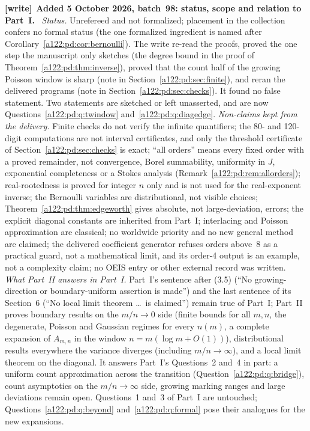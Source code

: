 \documentclass[11pt,letterpaper]{article}
\newenvironment{writenote}[1][]{\par\smallskip\begingroup\small
 \noindent\textbf{[write]}\if\relax\detokenize{#1}\relax\else~\textbf{#1.}\fi\ }%
 {\par\endgroup\smallskip}
\numberwithin{equation}{subsection}
\theoremstyle{definition}
\theoremstyle{remark}
\theoremstyle{plain}
\begin{document}
\begin{writenote}[Added 5 October 2026, batch~98: status, scope and relation to Part~I]
\emph{Status.} Unrefereed and not formalized; placement in the
collection confers no formal status (the one formalized ingredient is
named after Corollary~\ref{a122:pd:cor:bernoulli}). The write re-read the
proofs, proved the one step the manuscript only sketches
(the degree bound in the proof of Theorem~\ref{a122:pd:thm:inverse}),
proved that the count half of the growing Poisson window is sharp (note
in Section~\ref{a122:pd:sec:finite}), and reran the delivered programs
(note in Section~\ref{a122:pd:sec:checks}). It found no false statement.
Two statements are sketched or left unasserted, and are now
Questions~\ref{a122:pd:q:twindow} and~\ref{a122:pd:q:diagedge}.
\emph{Non-claims kept from the delivery.} Finite checks do not verify
the infinite quantifiers; the 80- and 120-digit computations are not
interval certificates, and only the threshold certificate of
Section~\ref{a122:pd:sec:checks} is exact; ``all orders'' means every
fixed order with a proved remainder, not convergence, Borel
summability, uniformity in $J$, exponential completeness or a Stokes
analysis (Remark~\ref{a122:pd:rem:allorders}); real-rootedness is
proved for integer $n$ only and is not used for the real-exponent
inverse; the Bernoulli variables are distributional, not visible
choices; Theorem~\ref{a122:pd:thm:edgeworth} gives absolute, not
large-deviation, errors; the explicit diagonal constants are inherited
from Part~I; interlacing and Poisson approximation are classical; no
worldwide priority and no new general method are claimed; the delivered
coefficient generator refuses orders above~8 as a practical guard, not a
mathematical limit, and its order-4 output is an example, not a
complexity claim; no OEIS entry or other external record was written.
\emph{What Part~II answers in Part~I.} Part~I's sentence after (3.5)
(``No growing-direction or boundary-uniform assertion is made'') and the
last sentence of its Section~6 (``No local limit theorem \dots\ is
claimed'') remain true of Part~I; Part~II proves boundary results on the
$m/n\to0$ side (finite bounds for all $m,n$, the degenerate, Poisson and
Gaussian regimes for every $n(m)$, a complete expansion of $A_{m,n}$ in
the window $n=m(\log m+O(1))$), distributional results everywhere the
variance diverges (including $m/n\to\infty$), and a local limit theorem
on the diagonal. It answers Part~I's Questions~2 and~4 in part: a
uniform count approximation across the transition
(Question~\ref{a122:pd:q:bridge}), count asymptotics on the
$m/n\to\infty$ side, growing marking ranges and large deviations remain
open. Questions~1 and~3 of Part~I are untouched;
Questions~\ref{a122:pd:q:beyond} and~\ref{a122:pd:q:formal} pose their
analogues for the new expansions.
\end{writenote}
\end{document}
